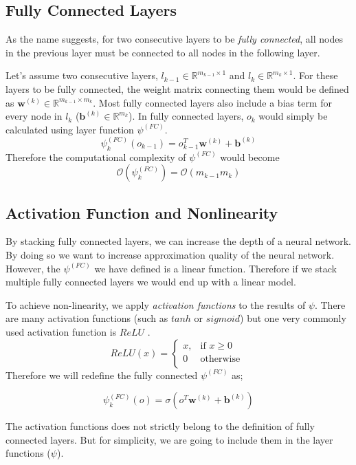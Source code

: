 \subsection{Fully Connected Layers}
As the name suggests, for two consecutive layers to be \textit{fully connected}, all nodes in the previous layer must be connected to all nodes in the following layer. 

Let's assume two consecutive layers, $l_{k-1} \in \mathbb{R}^{m_{k-1} \times 1}$ and $l_{k} \in \mathbb{R}^{m_k \times 1}$. For these layers to be fully connected, the weight matrix connecting them would be defined as $\mathbf{w}^{(k)} \in \mathbb{R}^{m_{k-1} \times m_{k}}$. Most fully connected layers also include a bias term for every node in $l_k$ ($\mathbf{b}^{(k)} \in  \mathbb{R}^{m_{k}}$). In fully connected layers, $o_k$ would simply be calculated using layer function $\psi^{(FC)}$.
$$ \psi^{(FC)}_k(o_{k-1}) = o_{k-1}^T\mathbf{w}^{(k)} + \mathbf{b}^{(k)}$$
Therefore the computational complexity of $\psi^{(FC)}$ would become
$$\mathcal{O}(\psi^{(FC)}_k) = \mathcal{O}(m_{k-1}m_{k})$$

\subsection{Activation Function and Nonlinearity}
By stacking fully connected layers, we can increase the depth of a neural network. By doing so we want to increase approximation quality of the neural network. However, the $\psi^{(FC)}$ we have defined is a linear function. Therefore if we stack multiple fully connected layers we would end up with a linear model. 

To achieve non-linearity, we apply \textit{activation functions} to the results of $\psi$. There are many activation functions (such as $tanh$ or $sigmoid$) but one very commonly used activation function is $ReLU$ \cite{nair2010rectified}.  
\begin{equation}
\label{eq:relu_definition}
    ReLU(x) = 
\begin{cases}
    x, & \text{if }x \geq 0\\
    0 &  \text{otherwise }\\
\end{cases}
\end{equation}
Therefore we will redefine the fully connected $\psi^{(FC)}$ as;

$$ \psi^{(FC)}_k(o) = \sigma(o^T\mathbf{w}^{(k)} + \mathbf{b}^{(k)})$$

The activation functions does not strictly belong to the definition of fully connected layers. But for simplicity, we are going to include them in the layer functions ($\psi$).

